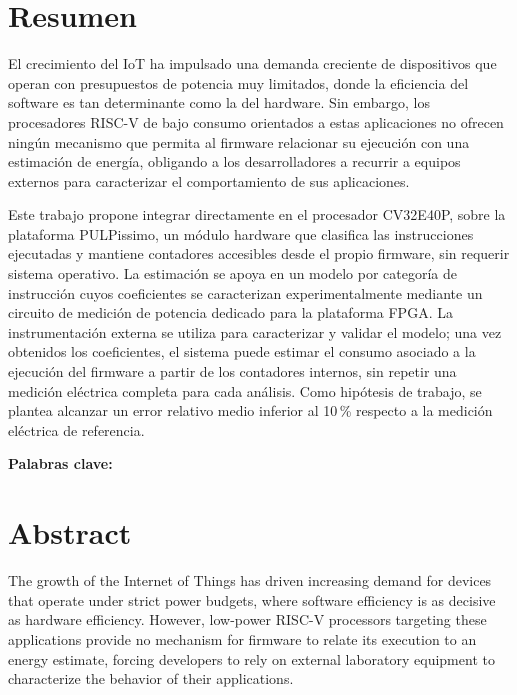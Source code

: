\chapter*{Resumen}
\thispagestyle{empty}


El crecimiento del IoT ha impulsado una demanda creciente de
dispositivos que operan con presupuestos de potencia muy limitados, donde la
eficiencia del software es tan determinante como la del hardware. Sin embargo,
los procesadores RISC-V de bajo consumo orientados a estas aplicaciones no
ofrecen ningún mecanismo que permita al firmware relacionar su ejecución con una
estimación de energía, obligando a los desarrolladores a recurrir a
equipos externos para caracterizar el comportamiento de sus
aplicaciones.

Este trabajo propone integrar directamente en el procesador CV32E40P, sobre la
plataforma PULPissimo, un módulo hardware que clasifica las instrucciones
ejecutadas y mantiene contadores accesibles desde el propio firmware, sin
requerir sistema operativo. La estimación se apoya en un modelo por categoría
de instrucción cuyos coeficientes se caracterizan experimentalmente mediante un
circuito de medición de potencia dedicado para la plataforma FPGA. La
instrumentación externa se utiliza para caracterizar y validar el modelo; una
vez obtenidos los coeficientes, el sistema puede estimar el consumo asociado a
la ejecución del firmware a partir de los contadores internos, sin repetir una
medición eléctrica completa para cada análisis. Como hipótesis de trabajo, se
plantea alcanzar un error relativo medio inferior al 10\,\% respecto a la
medición eléctrica de referencia.

\bigskip
\textbf{Palabras clave:} \scriptKeywords

\clearpage
\chapter*{Abstract}
\thispagestyle{empty}

The growth of the Internet of Things has driven increasing demand for devices
that operate under strict power budgets, where software efficiency is as
decisive as hardware efficiency. However, low-power RISC-V processors targeting
these applications provide no mechanism for firmware to relate its execution to
an energy estimate, forcing developers to rely on external laboratory equipment
to characterize the behavior of their applications.

